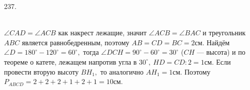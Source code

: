 237. \begin{figure}[ht!]
\end{figure}\\
$\angle CAD=\angle ACB$ как накрест лежащие, значит $\angle ACB=\angle BAC$ и треугольник $ABC$ является равнобедренным, поэтому $AB=CD=BC=2$см. Найдём $\angle D=180^\circ-120^\circ=60^\circ,$ тогда $\angle DCH=90^\circ-60^\circ=30^\circ$ ($CH$ --- высота) и по теореме о катете, лежащем напротив угла в $30^\circ,\ HD=CD:2=1$см. Если провести вторую высоту $BH_1,$ то аналогично $AH_1=1$см. Поэтому $P_{ABCD}=2+2+2+1+2+1=10$см.\newpage\noindent
